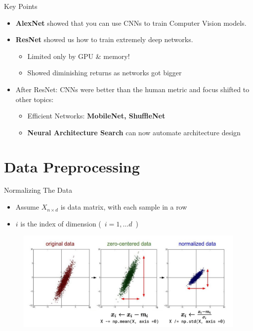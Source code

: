 \documentclass[serif, aspectratio=169]{beamer}
\begin{document}
\begin{frame}{Key Points}
	\begin{itemize}
		\item \textbf{AlexNet} showed that you can use CNNs to train Computer Vision models. 
		\item \textbf{ResNet} showed us how to train extremely deep networks.
		\begin{itemize}
			\item Limited only by GPU \& memory!
			\item Showed diminishing returns as networks got bigger
		\end{itemize}
		\item After ResNet: CNNs were better than the human metric and focus shifted to other topics:
		\begin{itemize}
			\item Efficient Networks: \textbf{MobileNet, ShuffleNet}
			\item \textbf{Neural Architecture Search} can now automate architecture design
		\end{itemize}
	\end{itemize}
\end{frame}

\section{Data Preprocessing}

\begin{frame}{Normalizing The Data}
	\begin{itemize}
		\item Assume $X_{n \times d}$ is data matrix, with each sample in a row
		\item $i$ is the index of dimension (\ $i = 1, \dots d$\ )
	\end{itemize}
	\begin{figure}[htpb]
		\begin{center}
			\includegraphics[keepaspectratio, scale=0.3]{pic/normaliz}
		\end{center}
	\end{figure}
\end{frame}
\end{document}
